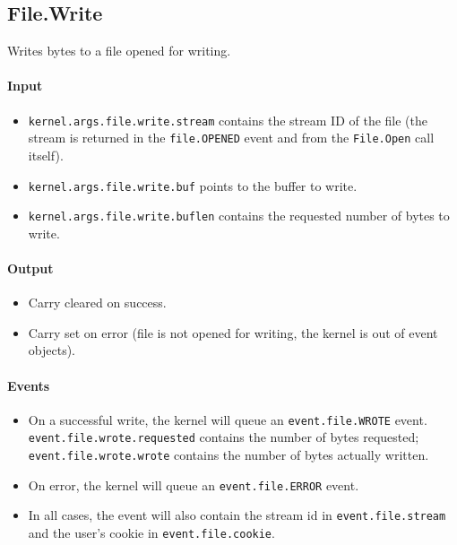 \subsection*{File.Write}
Writes bytes to a file opened for writing.

\paragraph{Input}
\begin{itemize}
\item \verb+kernel.args.file.write.stream+ contains the stream ID of the file (the stream is returned in the \verb+file.OPENED+ event and from the \verb+File.Open+ call itself).
\item \verb+kernel.args.file.write.buf+ points to the buffer to write.
\item \verb+kernel.args.file.write.buflen+ contains the requested number of bytes to write.
\end{itemize}

\paragraph{Output}
\begin{itemize}
\item Carry cleared on success.
\item Carry set on error (file is not opened for writing, the kernel is out of event objects).
\end{itemize}

\paragraph{Events}
\begin{itemize}
\item On a successful write, the kernel will queue an \verb+event.file.WROTE+ event. \\ \verb+event.file.wrote.requested+ contains the number of bytes requested; \\ \verb+event.file.wrote.wrote+ contains the number of bytes actually written.
\item On error, the kernel will queue an \verb+event.file.ERROR+ event.
\item In all cases, the event will also contain the stream id in \verb+event.file.stream+ and the user's cookie in \verb+event.file.cookie+.
\end{itemize}

